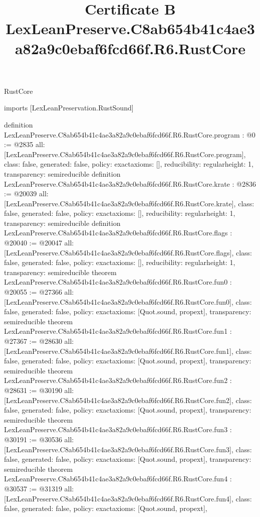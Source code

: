 \begin{lexlean}{RustCore}
\title{Certificate B LexLeanPreserve.C8ab654b41c4ae3a82a9c0ebaf6fcd66f.R6.RustCore}
\begin{coremodule}
imports [LexLeanPreservation.RustSound]

definition LexLeanPreserve.C8ab654b41c4ae3a82a9c0ebaf6fcd66f.R6.RustCore.program : @0 := @2835 {
  all: [LexLeanPreserve.C8ab654b41c4ae3a82a9c0ebaf6fcd66f.R6.RustCore.program],
  class: false,
  generated: false,
  policy: exact{axioms: []},
  reducibility: regular{height: 1},
  transparency: semireducible
}
definition LexLeanPreserve.C8ab654b41c4ae3a82a9c0ebaf6fcd66f.R6.RustCore.krate : @2836 := @20039 {
  all: [LexLeanPreserve.C8ab654b41c4ae3a82a9c0ebaf6fcd66f.R6.RustCore.krate],
  class: false,
  generated: false,
  policy: exact{axioms: []},
  reducibility: regular{height: 1},
  transparency: semireducible
}
definition LexLeanPreserve.C8ab654b41c4ae3a82a9c0ebaf6fcd66f.R6.RustCore.flags : @20040 := @20047 {
  all: [LexLeanPreserve.C8ab654b41c4ae3a82a9c0ebaf6fcd66f.R6.RustCore.flags],
  class: false,
  generated: false,
  policy: exact{axioms: []},
  reducibility: regular{height: 1},
  transparency: semireducible
}
theorem LexLeanPreserve.C8ab654b41c4ae3a82a9c0ebaf6fcd66f.R6.RustCore.fun0 : @20055 := @27366 {
  all: [LexLeanPreserve.C8ab654b41c4ae3a82a9c0ebaf6fcd66f.R6.RustCore.fun0],
  class: false,
  generated: false,
  policy: exact{axioms: [Quot.sound, propext]},
  transparency: semireducible
}
theorem LexLeanPreserve.C8ab654b41c4ae3a82a9c0ebaf6fcd66f.R6.RustCore.fun1 : @27367 := @28630 {
  all: [LexLeanPreserve.C8ab654b41c4ae3a82a9c0ebaf6fcd66f.R6.RustCore.fun1],
  class: false,
  generated: false,
  policy: exact{axioms: [Quot.sound, propext]},
  transparency: semireducible
}
theorem LexLeanPreserve.C8ab654b41c4ae3a82a9c0ebaf6fcd66f.R6.RustCore.fun2 : @28631 := @30190 {
  all: [LexLeanPreserve.C8ab654b41c4ae3a82a9c0ebaf6fcd66f.R6.RustCore.fun2],
  class: false,
  generated: false,
  policy: exact{axioms: [Quot.sound, propext]},
  transparency: semireducible
}
theorem LexLeanPreserve.C8ab654b41c4ae3a82a9c0ebaf6fcd66f.R6.RustCore.fun3 : @30191 := @30536 {
  all: [LexLeanPreserve.C8ab654b41c4ae3a82a9c0ebaf6fcd66f.R6.RustCore.fun3],
  class: false,
  generated: false,
  policy: exact{axioms: [Quot.sound, propext]},
  transparency: semireducible
}
theorem LexLeanPreserve.C8ab654b41c4ae3a82a9c0ebaf6fcd66f.R6.RustCore.fun4 : @30537 := @31319 {
  all: [LexLeanPreserve.C8ab654b41c4ae3a82a9c0ebaf6fcd66f.R6.RustCore.fun4],
  class: false,
  generated: false,
  policy: exact{axioms: [Quot.sound, propext]},
}
\end{coremodule}
\end{lexlean}
